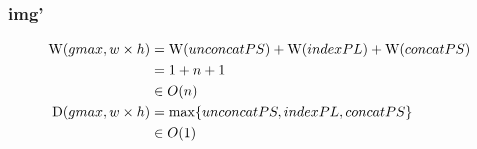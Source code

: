     \subsubsection*{img'}
      \begin{equation}
      \begin{split}
      \textrm{W}(gmax, w \times h)
            & = \textrm{W}(unconcatPS) + \textrm{W}(indexPL) + \textrm{W}(concatPS) \\
            & = 1 + n + 1 \\
            & \in O(n) \\
      \textrm{D}(gmax, w \times h)
          & = \max \{ unconcatPS, indexPL, concatPS \} \\
          & \in O(1)
      \end{split}
      \end{equation}
    

